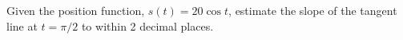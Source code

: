 {Given the position function, $s(t)=20\cos t$, estimate the slope of the tangent line at $t=\pi/2$ to within 2 decimal places.}
{}